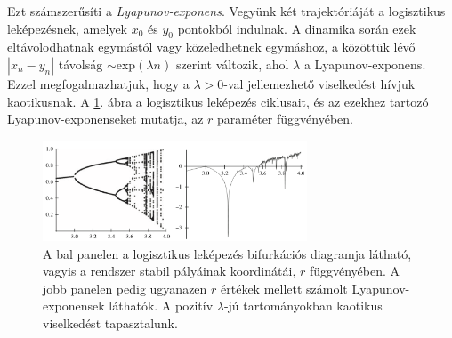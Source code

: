 \documentclass[12pt]{article}
\theoremstyle{plain}
\begin{document}
Ezt számszerűsíti a {\em Lyapunov-exponens}. Vegyünk két trajektóriáját a logisztikus leképezésnek, amelyek $x_0$ és $y_0$ pontokból indulnak. A dinamika során ezek eltávolodhatnak egymástól vagy közeledhetnek egymáshoz, a közöttük lévő $|x_n - y_n|$ távolság $\sim \text{exp}(\lambda n)$ szerint változik, ahol $\lambda$ a Lyapunov-exponens. Ezzel megfogalmazhatjuk, hogy a $\lambda > 0$-val jellemezhető viselkedést hívjuk kaotikusnak. A \ref{fig:lyap}. ábra a logisztikus leképezés ciklusait, és az ezekhez tartozó Lyapunov-exponenseket mutatja, az $r$ paraméter függvényében.

\begin{figure}[h!]
    \centering
    \includegraphics[width = 0.7\textwidth]{media/lyap.PNG}
    \caption{A bal panelen a logisztikus leképezés bifurkációs diagramja látható, vagyis a rendszer stabil pályáinak koordinátái, $r$ függvényében. A jobb panelen pedig ugyanazen $r$ értékek mellett számolt Lyapunov-exponensek láthatók. A pozitív $\lambda$-jú tartományokban kaotikus viselkedést tapasztalunk. }
    \label{fig:lyap}
\end{figure}
\newpage


\end{document}
